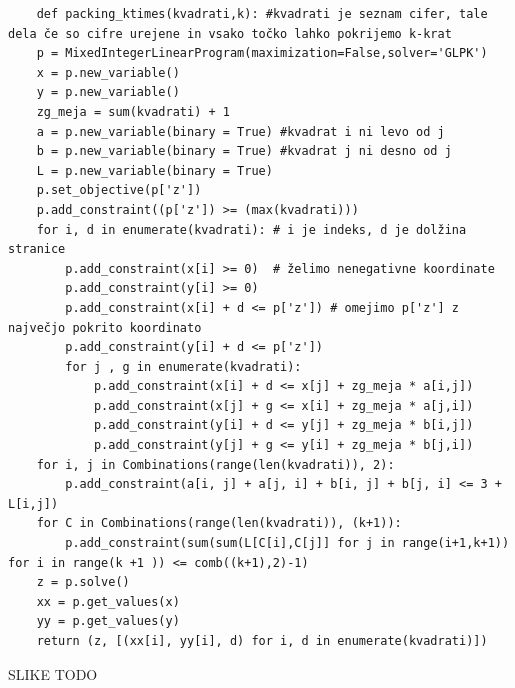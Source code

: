 \documentclass[a4paper, 11pt]{article}
\begin{document}
\begin{verbatim}
    def packing_ktimes(kvadrati,k): #kvadrati je seznam cifer, tale dela če so cifre urejene in vsako točko lahko pokrijemo k-krat
    p = MixedIntegerLinearProgram(maximization=False,solver='GLPK')
    x = p.new_variable()
    y = p.new_variable()
    zg_meja = sum(kvadrati) + 1
    a = p.new_variable(binary = True) #kvadrat i ni levo od j
    b = p.new_variable(binary = True) #kvadrat j ni desno od j
    L = p.new_variable(binary = True)
    p.set_objective(p['z'])
    p.add_constraint((p['z']) >= (max(kvadrati)))
    for i, d in enumerate(kvadrati): # i je indeks, d je dolžina stranice
        p.add_constraint(x[i] >= 0)  # želimo nenegativne koordinate
        p.add_constraint(y[i] >= 0)
        p.add_constraint(x[i] + d <= p['z']) # omejimo p['z'] z največjo pokrito koordinato
        p.add_constraint(y[i] + d <= p['z'])
        for j , g in enumerate(kvadrati):
            p.add_constraint(x[i] + d <= x[j] + zg_meja * a[i,j])
            p.add_constraint(x[j] + g <= x[i] + zg_meja * a[j,i])
            p.add_constraint(y[i] + d <= y[j] + zg_meja * b[i,j])
            p.add_constraint(y[j] + g <= y[i] + zg_meja * b[j,i])
    for i, j in Combinations(range(len(kvadrati)), 2):
        p.add_constraint(a[i, j] + a[j, i] + b[i, j] + b[j, i] <= 3 + L[i,j])
    for C in Combinations(range(len(kvadrati)), (k+1)):
        p.add_constraint(sum(sum(L[C[i],C[j]] for j in range(i+1,k+1)) for i in range(k +1 )) <= comb((k+1),2)-1)
    z = p.solve()
    xx = p.get_values(x)
    yy = p.get_values(y)
    return (z, [(xx[i], yy[i], d) for i, d in enumerate(kvadrati)]) 
\end{verbatim}

SLIKE TODO
\end{document}
